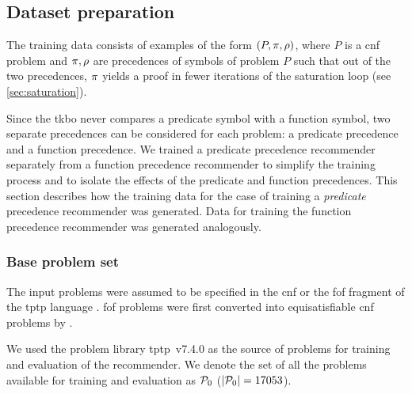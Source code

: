 

\subsection{Dataset preparation}

The training data consists of examples of the form $(P, \pi, \rho)$,
where $P$ is a \gls{cnf} problem and $\pi, \rho$ are precedences of symbols of problem $P$
such that out of the two precedences, $\pi$ yields a proof in fewer iterations of the saturation loop (see \cref{sec:saturation}).

Since the \gls{tkbo} never compares a predicate symbol with a function symbol,
two separate precedences can be considered for each problem:
a predicate precedence and a function precedence.
We trained a predicate precedence recommender separately from a function precedence recommender
to simplify the training process and to isolate the effects of the predicate and function precedences.
This section describes how the training data for the case of training a \emph{predicate} precedence recommender was generated.
Data for training the function precedence recommender was generated analogously.

\subsubsection{Base problem set}

The input problems were assumed to be specified in the \gls{cnf} or the \gls{fof} fragment
of the \acrshort{tptp} language \cite{Sutcliffe2017}.
\Gls{fof} problems were first converted into equisatisfiable \gls{cnf} problems by \Vampire{}.

We used the problem library \acrshort{tptp}~v7.4.0 \cite{Sutcliffe2017}
as the source of problems for training and evaluation of the recommender.
We denote the set of all the problems available for training and evaluation as $\operatorname{\mathcal{P}_{0}}$ ($\lvert\operatorname{\mathcal{P}_{0}}\rvert = 17053$).

